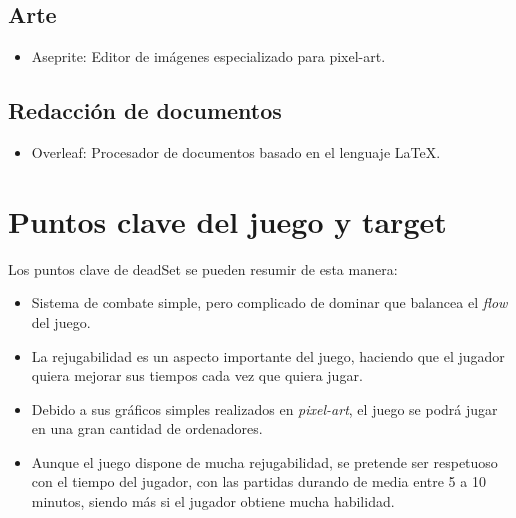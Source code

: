 \documentclass[12pt]{article}
\begin{document}
    \subsection{Arte}
        \begin{itemize}
            \item Aseprite: Editor de imágenes especializado para pixel-art. 
        \end{itemize}

    \subsection{Redacción de documentos}
        \begin{itemize}
            \item Overleaf: Procesador de documentos basado en el lenguaje LaTeX. 
        \end{itemize}


\newpage
\section{Puntos clave del juego y target}
    Los puntos clave de \textunderscore deadSet se pueden resumir de esta manera: 
    \begin{itemize}
        \item Sistema de combate simple, pero complicado de dominar que balancea el \textit{flow} del juego.
        \item La rejugabilidad es un aspecto importante del juego, haciendo que el jugador quiera mejorar sus tiempos cada vez que quiera jugar. 
        \item Debido a sus gráficos simples realizados en \textit{pixel-art}, el juego se podrá jugar en una gran cantidad de ordenadores. 
        \item Aunque el juego dispone de mucha rejugabilidad, se pretende ser respetuoso con el tiempo del jugador, con las partidas durando de media entre 5 a 10 minutos, siendo más si el jugador obtiene mucha habilidad. 
    \end{itemize}
        
\end{document}
